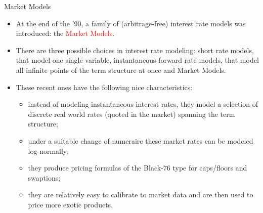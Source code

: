 \documentclass{beamer}
\begin{document}
\begin{frame}{Market Models}
  \begin{itemize}
  \item<1-> At the end of the ’90, a family of (arbitrage-free) interest rate models was introduced: the \textcolor{red}{Market Models}. %
  \item<2-> There are three possible choices in interest rate modeling: short rate models, that model one single variable, instantaneous forward rate models, that model all infinite points of the term structure at once and Market Models.
  \item<3-> These recent ones have the following nice characteristics:
    \begin{itemize}
    \item instead of modeling instantaneous interest rates, they model a selection of discrete real world rates (quoted in the market) spanning the term structure;
    \item under a suitable change of numeraire these market rates can be modeled log-normally;
    \item they produce pricing formulas of the Black-76 type for caps/floors and swaptions;
    \item they are relatively easy to calibrate to market data and are then used to price more exotic products.
    \end{itemize}
  \end{itemize}
\end{frame}
\end{document}
